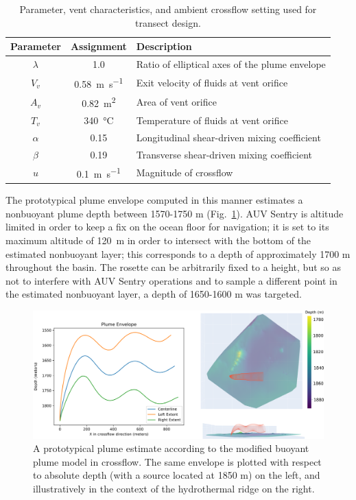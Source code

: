 \begin{table}[h!]
    \centering
    \begin{tabular}{c|c|l}
        Parameter & Assignment & Description \\
        \hline
        $\lambda$ & 1.0 & Ratio of elliptical axes of the plume envelope \\
        $V_v$ & \SI{0.58}{\meter\per\second} & Exit velocity of fluids at vent orifice \\
        $A_v$ & \SI{0.82}{\meter\squared} & Area of vent orifice \\
        $T_v$ & \SI{340}{\celsius} & Temperature of fluids at vent orifice \\
        $\alpha$ & 0.15 & Longitudinal shear-driven mixing coefficient \\
        $\beta$ & 0.19 & Transverse shear-driven mixing coefficient \\
        $u$ & \SI{0.1}{\meter\per\second} & Magnitude of crossflow \\
    \end{tabular}
    \caption{Parameter, vent characteristics, and ambient crossflow setting used for transect design.}
    \label{tab:params}
\end{table}

The prototypical plume envelope computed in this manner estimates a nonbuoyant plume depth between 1570-1750 m (Fig.~\ref{fig:plume_envelopes}). AUV Sentry is altitude limited in order to keep a fix on the ocean floor for navigation; it is set to its maximum altitude of \SI{120}{\meter} in order to intersect with the bottom of the estimated nonbuoyant layer; this corresponds to a depth of approximately 1700 m throughout the basin. The rosette can be arbitrarily fixed to a height, but so as not to interfere with AUV Sentry operations and to sample a different point in the estimated nonbuoyant layer, a depth of 1650-1600 m was targeted.

\begin{figure}[h!]
    \centering
    \includegraphics[width=1\columnwidth]{figures/plume_envelopes.png}
    \caption{A prototypical plume estimate according to the modified buoyant plume model in crossflow. The same envelope is plotted with respect to absolute depth (with a source located at 1850 m) on the left, and illustratively in the context of the hydrothermal ridge on the right.}
    \label{fig:plume_envelopes}
\end{figure}
